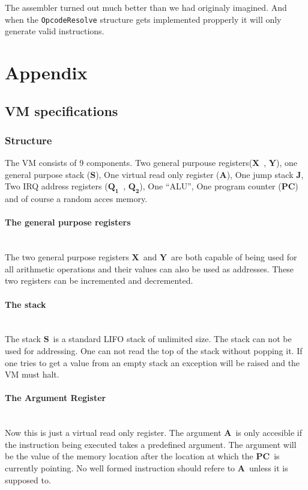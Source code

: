 \documentclass{article}
\newcommand{\V}{\verb}
\newcommand{\x}{$\textbf{X}$}
\newcommand{\y}{$\textbf{Y}$}
\newcommand{\s}{$\textbf{S}$}
\newcommand{\A}{$\textbf{A}$}
\newcommand{\q}{$\textbf{Q}_{\textbf{1}}$}
\newcommand{\qq}{$\textbf{Q}_{\textbf{2}}$}
\newcommand{\pc}{$\textbf{PC}$}
\newcommand{\J}{$\textbf{J}$}
\begin{document}
The assembler turned out much better than we had originaly imagined. And when
the \V+OpcodeResolve+ structure gets implemented propperly it will only generate
valid instructions.
\section{Appendix}
\subsection{VM specifications}
\subsubsection{Structure}
The VM consists of 9 components. Two general purpouse registers(\x \ , \y ), one
general purpose stack (\s), One virtual read only register (\A), One jump stack
\J, Two IRQ address registers (\q \ , \qq), One ``ALU'', One program counter
(\pc) and of course a random acces memory.

\paragraph{The general purpose registers} \
\\
The two general purpose registers \x \ and \y \ are both capable of being used
for all arithmetic operations and their values can also be used as addresses.
These two registers can be incremented and decremented.

\paragraph{The stack} \
\\
The stack \s \ is a standard LIFO stack of unlimited size. The stack can not be
used for addressing. One can not read the top of the stack without popping it. If
one tries to get a value from an empty stack an exception will be raised and the
VM must halt.

\paragraph{The Argument Register} \
\\
Now this is just a virtual read only register. The argument \A \  is only
accesible if the instruction being executed takes a predefined argument. The
argument will be the value of the memory location after the location at which
the \pc \  is currently pointing. No well formed instruction should refere to
\A \ unless it is supposed to.
\end{document}
